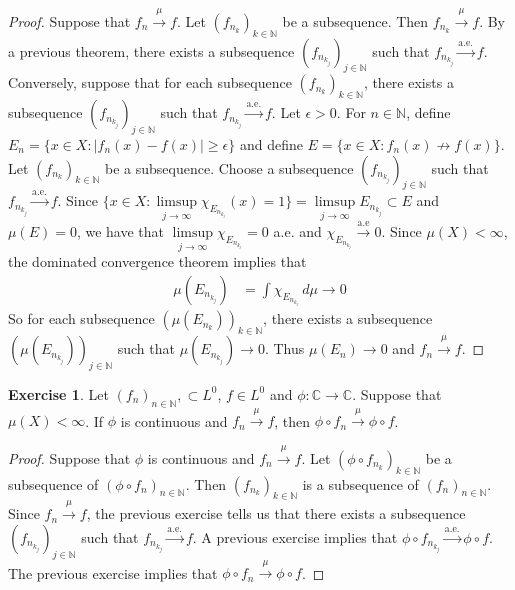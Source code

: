 \documentclass{book}
\theoremstyle{definition}
\newtheorem{ex}[definition]{Exercise}
\newcommand{\ep}{\epsilon}
\newcommand{\C}{\mathbb{C}}
\newcommand{\N}{\mathbb{N}}
\newcommand{\lex}[1]{\label{ex:#1}}
\DeclareMathOperator*{\0}{\mbf{0}}
\DeclareMathOperator*{\1}{\mbf{1}}
\newcommand{\convt}[1]{\xrightarrow{\text{#1}}}
\newcommand{\conv}[1]{\xrightarrow{#1}}
\newcommand{\dmu}{\, d \mu}
\begin{document}
	\begin{proof}
		Suppose that $f_n \conv{\mu} f$. Let $(f_{n_k})_{k \in \N}$ be a subsequence. Then $f_{n_k} \conv{\mu} f$. By a previous theorem, there exists a subsequence $(f_{n_{k_j}})_{j \in \N}$ such that $f_{n_{k_j}} \convt{a.e.} f$. Conversely, suppose that for each subsequence $(f_{n_k})_{k \in \N}$, there exists a subsequence $(f_{n_{k_j}})_{j \in \N}$ such that $f_{n_{k_j}} \convt{a.e.} f$. Let $\ep >0$. For $n \in \N$, define $E_{n} = \{x \in X: |f_n(x) - f(x) | \geq \ep\}$ and define $E = \{x \in X: f_n(x) \not \rightarrow f(x)\}$. Let $(f_{n_k})_{k \in \N}$ be a subsequence. Choose a subsequence $(f_{n_{k_j}})_{j \in \N}$ such that $f_{n_{k_j}} \convt{a.e.} f$. Since $\bigg \{x \in X: \limsup\limits_{j \rightarrow \infty} \chi_{E_{n_{k_j}}}(x) = 1\bigg \} = \limsup\limits_{j \rightarrow \infty} E_{n_{k_j}} \subset E$ and $\mu(E) = 0$, we have that $\limsup\limits_{j \rightarrow \infty} \chi_{E_{n_{k_j}}} = 0$ a.e. and $\chi_{E_{n_{k_j}}} \convt{a.e} 0$. Since $\mu(X) < \infty$, the dominated convergence theorem implies that 
		\begin{align*}
			\mu(E_{n_{k_j}}) 
			&= \int \chi_{E_{n_{k_j}}} \dmu  \rightarrow 0
		\end{align*} 
		So for each subsequence $(\mu(E_{n_k}))_{k \in \N}$, there exists a subsequence $(\mu(E_{n_{k_j}}))_{j \in \N}$ such that $\mu(E_{n_{k_j}}) \rightarrow 0$. Thus $\mu(E_n) \rightarrow 0$ and $f_n \conv{\mu} f$.
	\end{proof}
	
	\begin{ex} \lex{35014} 
		Let $(f_n)_{n \in \N}, \subset L^0$, $f \in L^0$ and $\phi: \C \rightarrow \C$. Suppose that $\mu(X) < \infty$. If $\phi$ is continuous and $f_n \conv{\mu} f$, then $\phi \circ f_n \conv{\mu} \phi \circ f$.
	\end{ex}
	
	\begin{proof}
		Suppose that $\phi$ is continuous and $f_n \conv{\mu} f$. Let $(\phi \circ f_{n_k})_{k \in \N}$ be a subsequence of $(\phi \circ f_{n})_{n \in \N}$. Then $(f_{n_k})_{k \in \N}$ is a subsequence of $(f_{n})_{n \in \N}$. Since $f_n \conv{\mu} f$, the previous exercise tells us that there exists a subsequence $(f_{n_{k_j}})_{j \in \N}$ such that $f_{n_{k_j}} \convt{a.e.} f$. A previous exercise implies that $\phi \circ f_{n_{k_j}}\convt{a.e.} \phi \circ f$. The previous exercise implies that $\phi \circ f_{n}\conv{\mu} \phi \circ f$.
	\end{proof}
	
\end{document}
